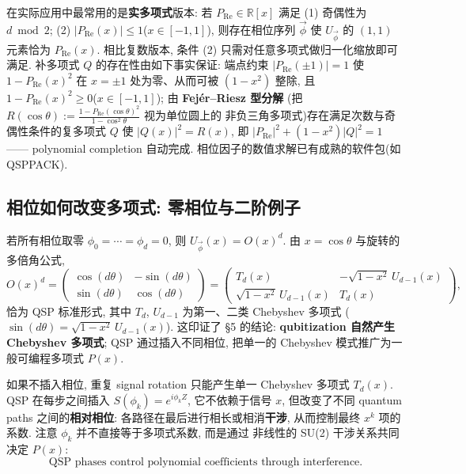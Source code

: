 \documentclass[utf8]{article} %
\numberwithin{equation}{section}   %
\newtheorem{Note}{\hskip 2em {\color{red} 注}}[subsection]
\begin{document}
\begin{Note}[实多项式版本的充分条件]
    在实际应用中最常用的是\textbf{实多项式}版本: 若 $P_{\mathrm{Re}} \in \mathbb{R}[x]$ 满足
    (1) 奇偶性为 $d \bmod 2$; (2) $|P_{\mathrm{Re}}(x)| \le 1$($x \in [-1,1]$),
    则存在相位序列 $\vec\phi$ 使 $U_{\vec\phi}$ 的 $(1,1)$ 元素恰为 $P_{\mathrm{Re}}(x)$.
    相比复数版本, 条件 (2) 只需对任意多项式做归一化缩放即可满足.
    补多项式 $Q$ 的存在性由如下事实保证: 端点约束 $|P_{\mathrm{Re}}(\pm1)|=1$ 使
    $1 - P_{\mathrm{Re}}(x)^2$ 在 $x=\pm1$ 处为零、从而可被 $(1-x^2)$ 整除, 且
    $1-P_{\mathrm{Re}}(x)^2\ge0$($x\in[-1,1]$); 由 \textbf{Fej\'er--Riesz 型分解}
    (把 $R(\cos\theta) := \frac{1-P_{\mathrm{Re}}(\cos\theta)^2}{1-\cos^2\theta}$ 视为单位圆上的
    非负三角多项式)存在满足次数与奇偶性条件的复多项式 $Q$ 使
    $|Q(x)|^2 = R(x)$, 即 $|P_{\mathrm{Re}}|^2 + (1-x^2)|Q|^2 = 1$ —— polynomial completion 自动完成.
    相位因子的数值求解已有成熟的软件包(如 QSPPACK).
\end{Note}

\subsection{相位如何改变多项式: 零相位与二阶例子}

\begin{Note}
    若所有相位取零 $\phi_0 = \cdots = \phi_d = 0$, 则 $U_{\vec\phi}(x) = O(x)^d$.
    由 $x = \cos\theta$ 与旋转的多倍角公式,
    \begin{equation}
        O(x)^d = \begin{pmatrix} \cos(d\theta) & -\sin(d\theta) \\ \sin(d\theta) & \cos(d\theta) \end{pmatrix}
        = \begin{pmatrix} T_d(x) & -\sqrt{1-x^2}\,U_{d-1}(x) \\
            \sqrt{1-x^2}\,U_{d-1}(x) & T_d(x) \end{pmatrix},
    \end{equation}
    恰为 QSP 标准形式, 其中 $T_d$, $U_{d-1}$ 为第一、二类 Chebyshev 多项式
    ($\sin(d\theta) = \sqrt{1-x^2}\,U_{d-1}(x)$). 这印证了 §5 的结论:
    \textbf{qubitization 自然产生 Chebyshev 多项式}; QSP 通过插入不同相位, 把单一的
    Chebyshev 模式推广为一般可编程多项式 $P(x)$.
\end{Note}

\begin{Note}[相位通过干涉改变多项式]
    如果不插入相位, 重复 signal rotation 只能产生单一 Chebyshev 多项式 $T_d(x)$.
    QSP 在每步之间插入 $S(\phi_k) = e^{i\phi_k Z}$, 它不依赖于信号 $x$, 但改变了不同
    quantum paths 之间的\textbf{相对相位}: 各路径在最后进行相长或相消\textbf{干涉},
    从而控制最终 $x^k$ 项的系数. 注意 $\phi_k$ 并不直接等于多项式系数, 而是通过
    非线性的 SU(2) 干涉关系共同决定 $P(x)$:
    \begin{equation}
        \text{QSP phases control polynomial coefficients through interference}.
    \end{equation}
\end{Note}
\end{document}
